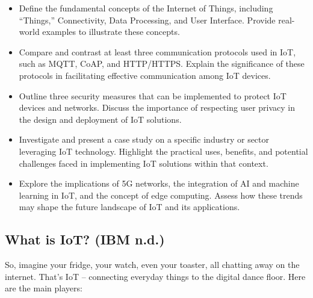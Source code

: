 \documentclass[
  letterpaper,
  DIV=11,
  numbers=noendperiod]{scrreprt}
\begin{document}
\begin{itemize}
\item
  Define the fundamental concepts of the Internet of Things, including
  ``Things,'' Connectivity, Data Processing, and User Interface. Provide
  real-world examples to illustrate these concepts.
\item
  Compare and contrast at least three communication protocols used in
  IoT, such as MQTT, CoAP, and HTTP/HTTPS. Explain the significance of
  these protocols in facilitating effective communication among IoT
  devices.
\item
  Outline three security measures that can be implemented to protect IoT
  devices and networks. Discuss the importance of respecting user
  privacy in the design and deployment of IoT solutions.
\item
  Investigate and present a case study on a specific industry or sector
  leveraging IoT technology. Highlight the practical uses, benefits, and
  potential challenges faced in implementing IoT solutions within that
  context.
\item
  Explore the implications of 5G networks, the integration of AI and
  machine learning in IoT, and the concept of edge computing. Assess how
  these trends may shape the future landscape of IoT and its
  applications.
\end{itemize}

\subsection{What is IoT? (IBM n.d.)}\label{what-is-iot-ibm_iot}

So, imagine your fridge, your watch, even your toaster, all chatting
away on the internet. That's IoT -- connecting everyday things to the
digital dance floor. Here are the main players:
\end{document}
